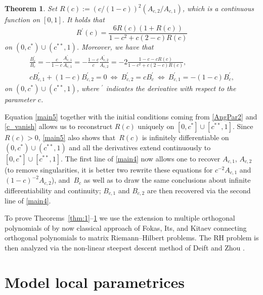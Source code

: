 \documentclass[pdftex]{sigma}
\numberwithin{equation}{section}
\newtheorem{Theorem}{Theorem}[section]
\begin{document}
\begin{Theorem}
\label{thm:4}
Set $ R(c) := (c/(1-c))^2 (A_{c,2}/A_{c,1}) $, which is a continuous function on $ [0,1] $. It holds that
\begin{equation}
\label{main5}
R^\prime(c) = \frac{6R(c)(1+R(c))}{1-c^2+c(2-c)R(c)}
\end{equation}
on $ (0,c^*)\cup(c^{**},1) $. Moreover, we have that
\begin{gather}
 \frac{B_c^\prime}{B_c} = -\frac c{1-c} \frac{A_{c,1}^\prime}{A_{c,1}} = -\frac{1-c}c \frac{A_{c,2}^\prime}{A_{c,2}} = -2\frac{1-c-cR(c)}{1-c^2+c(2-c)R(c)},\nonumber \\
c B_{c,1}^\prime + (1-c) B_{c,2}^\prime = 0 \ \Leftrightarrow \ B_{c,2}^\prime = c B_c^\prime \ \Leftrightarrow \ B_{c,1}^\prime = -(1-c) B_c^\prime,\label{main4}
\end{gather}
on $ (0,c^*)\cup(c^{**},1) $, where $ ^\prime $ indicates the derivative with respect to the parameter $ c $.
\end{Theorem}

\begin{Remark}
Equation \eqref{main5} together with the initial conditions coming from \eqref{AngPar2} and \eqref{c_vanish} allows us to reconstruct $ R(c) $ uniquely on $ [0,c^*]\cup[c^{**},1] $. Since~$ R(c)>0 $, \eqref{main5} also shows that~$ R(c) $ is infinitely differentiable on $ (0,c^*)\cup(c^{**},1) $ and all the derivatives extend continuously to $ [0,c^*]\cup[c^{**},1] $. The first line of \eqref{main4} now allows one to recover $ A_{c,1} $, $ A_{c,2} $ \big(to remove singularities, it is better two rewrite these equations for $ c^{-2}A_{c,1} $ and $ (1-c)^{-2} A_{c,2} $\big), and~$ B_c $ as well as to draw the same conclusions about infinite differentiability and continuity; $ B_{c,1} $ and $ B_{c,2} $ are then recovered via the second line of \eqref{main4}.
\end{Remark}

To prove Theorems~\ref{thm:1}--\ref{thm:4} we use the extension to multiple orthogonal polynomials \cite{GerKVA01} of by now classical approach of Fokas, Its, and Kitaev \cite{FIK91,FIK92} connecting orthogonal polynomials to matrix Riemann--Hilbert problems. The RH problem is then analyzed via the non-linear steepest descent method of Deift and Zhou \cite{DZ93}.


\section{Model local parametrices}
\label{sec:MLP}
\end{document}

